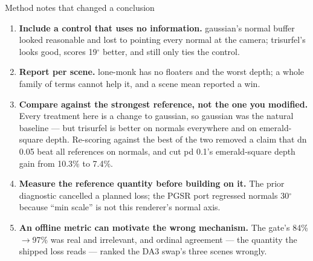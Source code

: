 \documentclass[aspectratio=169,9pt]{beamer}
\makeatletter
\newcommand{\code}[1]{{\ttfamily\fontsize{0.92\f@size}{\f@baselineskip}\selectfont #1}}
\makeatother
\begin{document}
\begin{frame}{Method notes that changed a conclusion}
  \begin{enumerate}
    \item \textbf{Include a control that uses no information.} \code{gaussian}'s normal buffer
          looked reasonable and lost to pointing every normal at the camera;
          \code{trisurfel}'s looks good, scores 19$^\circ$ better, and still only ties the
          control.
    \item \textbf{Report per scene.} \code{lone-monk} has no floaters and the worst depth; a
          whole family of terms cannot help it, and a scene mean reported a win.
    \item \textbf{Compare against the strongest reference, not the one you modified.} Every
          treatment here is a change to \code{gaussian}, so \code{gaussian} was the natural
          baseline --- but \code{trisurfel} is better on normals everywhere and on
          \code{emerald-square} depth. Re-scoring against the best of the two removed a claim
          that \code{dn 0.05} beat all references on normals, and cut \code{pd 0.1}'s
          \code{emerald-square} depth gain from 10.3\% to 7.4\%.
    \item \textbf{Measure the reference quantity before building on it.} The prior diagnostic
          cancelled a planned loss; the PGSR port regressed normals 30$^\circ$ because
          ``min scale'' is not this renderer's normal axis.
    \item \textbf{An offline metric can motivate the wrong mechanism.} The gate's
          84\%$\to$97\% was real and irrelevant, and ordinal agreement --- the quantity the
          shipped loss reads --- ranked the DA3 swap's three scenes wrongly.
  \end{enumerate}
\end{frame}
\end{document}
